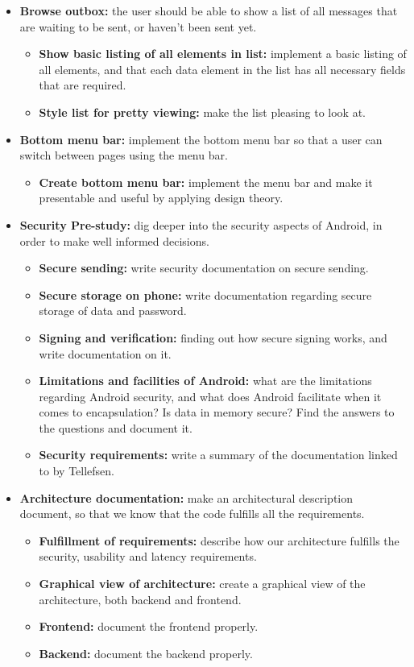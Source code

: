 \begin{itemize}
\begin{itemize}
\end{itemize}
\item{}\textbf{Browse outbox:} the user should be able to show a list of all messages that are waiting to be sent, or haven’t been sent yet.
\begin{itemize}
\item{}\textbf{Show basic listing of all elements in list:} implement a basic listing of all elements, and that each data element in the list has all necessary fields that are required.
\item{}\textbf{Style list for pretty viewing:} make the list pleasing to look at.
\end{itemize}
\item{}\textbf{Bottom menu bar:} implement the bottom menu bar so that a user can switch between pages using the menu bar.
\begin{itemize}
\item{}\textbf{Create bottom menu bar:} implement the menu bar and make it presentable and useful by applying design theory.
\end{itemize}

\newpage

\item{}\textbf{Security Pre-study:} dig deeper into the security aspects of Android, in order to make well informed decisions.
\begin{itemize}
\item{}\textbf{Secure sending:} write security documentation on secure sending.
\item{}\textbf{Secure storage on phone:} write documentation regarding secure storage of data and password.
\item{}\textbf{Signing and verification:} finding out how secure signing works, and write documentation on it.
\item{}\textbf{Limitations and facilities of Android:} what are the limitations regarding Android security, and what does Android facilitate when it comes to encapsulation? Is data in memory secure? Find the answers to the questions and document it.
\item{}\textbf{Security requirements:} write a summary of the documentation linked to by Tellefsen.
\end{itemize}
\item{}\textbf{Architecture documentation:} make an architectural description document, so that we know that the code fulfills all the requirements.
\begin{itemize}
\item{}\textbf{Fulfillment of requirements:} describe how our architecture fulfills the security, usability and latency requirements.
\item{}\textbf{Graphical view of architecture:} create a graphical view of the architecture, both backend and frontend.
\item{}\textbf{Frontend:} document the frontend properly.
\item{}\textbf{Backend:} document the backend properly.
\end{itemize}
\end{itemize}
